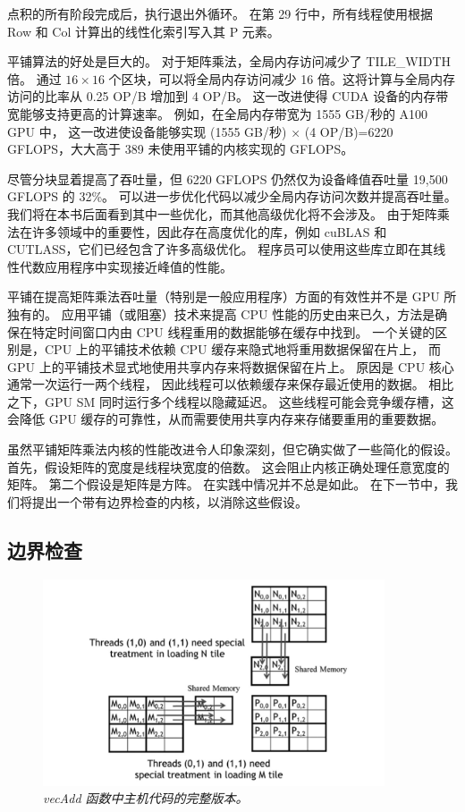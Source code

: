 点积的所有阶段完成后，执行退出外循环。 在第 29 行中，所有线程使用根据 Row 和 Col 计算出的线性化索引写入其 P 元素。

平铺算法的好处是巨大的。 对于矩阵乘法，全局内存访问减少了 TILE\_WIDTH 倍。 
通过 $16 \times 16$ 个区块，可以将全局内存访问减少 16 倍。这将计算与全局内存访问的比率从 0.25 OP/B 增加到 4 OP/B。 
这一改进使得 CUDA 设备的内存带宽能够支持更高的计算速率。 
例如，在全局内存带宽为 1555 GB/秒的 A100 GPU 中，
这一改进使设备能够实现 (1555 GB/秒) × (4 OP/B)=6220 GFLOPS，大大高于 389 未使用平铺的内核实现的 GFLOPS。

尽管分块显着提高了吞吐量，但 6220 GFLOPS 仍然仅为设备峰值吞吐量 19,500 GFLOPS 的 32\%。 
可以进一步优化代码以减少全局内存访问次数并提高吞吐量。 我们将在本书后面看到其中一些优化，而其他高级优化将不会涉及。 
由于矩阵乘法在许多领域中的重要性，因此存在高度优化的库，例如 cuBLAS 和 CUTLASS，它们已经包含了许多高级优化。 
程序员可以使用这些库立即在其线性代数应用程序中实现接近峰值的性能。

平铺在提高矩阵乘法吞吐量（特别是一般应用程序）方面的有效性并不是 GPU 所独有的。 
应用平铺（或阻塞）技术来提高 CPU 性能的历史由来已久，方法是确保在特定时间窗口内由 CPU 线程重用的数据能够在缓存中找到。 
一个关键的区别是，CPU 上的平铺技术依赖 CPU 缓存来隐式地将重用数据保留在片上，
而 GPU 上的平铺技术显式地使用共享内存来将数据保留在片上。 原因是 CPU 核心通常一次运行一两个线程，
因此线程可以依赖缓存来保存最近使用的数据。 相比之下，GPU SM 同时运行多个线程以隐藏延迟。 
这些线程可能会竞争缓存槽，这会降低 GPU 缓存的可靠性，从而需要使用共享内存来存储要重用的重要数据。

虽然平铺矩阵乘法内核的性能改进令人印象深刻，但它确实做了一些简化的假设。 首先，假设矩阵的宽度是线程块宽度的倍数。 
这会阻止内核正确处理任意宽度的矩阵。 第二个假设是矩阵是方阵。 在实践中情况并不总是如此。 
在下一节中，我们将提出一个带有边界检查的内核，以消除这些假设。

\subsection{边界检查}
\begin{figure}[H]
	\centering
	\includegraphics[width=0.9\textwidth]{figs/F5.11.png}
	\caption{\textit{\color{red} vecAdd 函数中主机代码的完整版本。}}
\end{figure}

